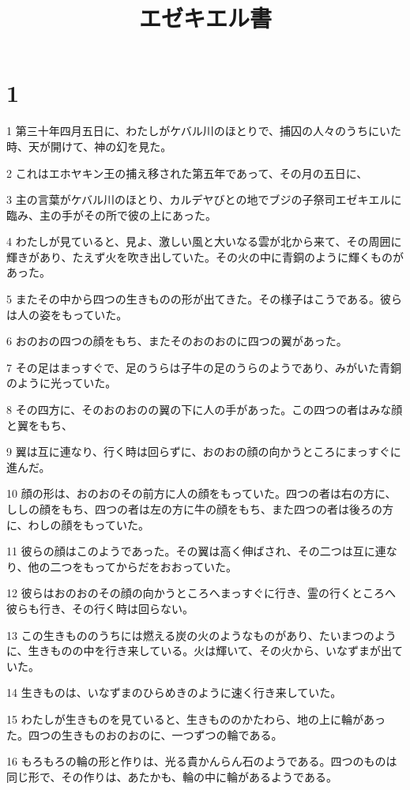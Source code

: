 

\title{エゼキエル書}


\chapter{1}

\par 1 第三十年四月五日に、わたしがケバル川のほとりで、捕囚の人々のうちにいた時、天が開けて、神の幻を見た。
\par 2 これはエホヤキン王の捕え移された第五年であって、その月の五日に、
\par 3 主の言葉がケバル川のほとり、カルデヤびとの地でブジの子祭司エゼキエルに臨み、主の手がその所で彼の上にあった。
\par 4 わたしが見ていると、見よ、激しい風と大いなる雲が北から来て、その周囲に輝きがあり、たえず火を吹き出していた。その火の中に青銅のように輝くものがあった。
\par 5 またその中から四つの生きものの形が出てきた。その様子はこうである。彼らは人の姿をもっていた。
\par 6 おのおの四つの顔をもち、またそのおのおのに四つの翼があった。
\par 7 その足はまっすぐで、足のうらは子牛の足のうらのようであり、みがいた青銅のように光っていた。
\par 8 その四方に、そのおのおのの翼の下に人の手があった。この四つの者はみな顔と翼をもち、
\par 9 翼は互に連なり、行く時は回らずに、おのおの顔の向かうところにまっすぐに進んだ。
\par 10 顔の形は、おのおのその前方に人の顔をもっていた。四つの者は右の方に、ししの顔をもち、四つの者は左の方に牛の顔をもち、また四つの者は後ろの方に、わしの顔をもっていた。
\par 11 彼らの顔はこのようであった。その翼は高く伸ばされ、その二つは互に連なり、他の二つをもってからだをおおっていた。
\par 12 彼らはおのおのその顔の向かうところへまっすぐに行き、霊の行くところへ彼らも行き、その行く時は回らない。
\par 13 この生きもののうちには燃える炭の火のようなものがあり、たいまつのように、生きものの中を行き来している。火は輝いて、その火から、いなずまが出ていた。
\par 14 生きものは、いなずまのひらめきのように速く行き来していた。
\par 15 わたしが生きものを見ていると、生きもののかたわら、地の上に輪があった。四つの生きものおのおのに、一つずつの輪である。
\par 16 もろもろの輪の形と作りは、光る貴かんらん石のようである。四つのものは同じ形で、その作りは、あたかも、輪の中に輪があるようである。
